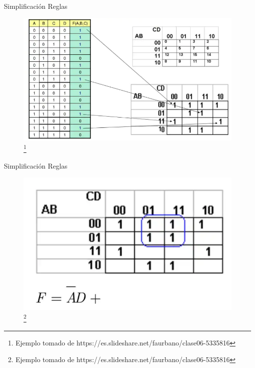 \documentclass[aspectratio=169]{beamer}
\begin{document}
\begin{frame}{Simplificación Reglas}
    \begin{figure}
        \includegraphics[scale=.5]{ejem/kar/Ejemplo.png}\footnote{Ejemplo tomado de https://es.slideshare.net/faurbano/clase06-5335816}
    \end{figure}
\end{frame}

\begin{frame}{Simplificación Reglas}
    \begin{figure}
        \includegraphics[scale=.4]{ejem/kar/ej_2.png}\footnote{Ejemplo tomado de https://es.slideshare.net/faurbano/clase06-5335816}
    \end{figure}
\end{frame}
\end{document}
